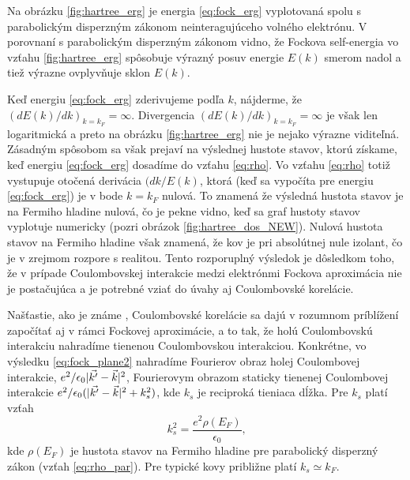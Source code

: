 Na obrázku \ref{fig:hartree_erg} je energia \eqref{eq:fock_erg} vyplotovaná spolu s parabolickým disperzným zákonom neinteragujúceho volného elektrónu.
V porovnaní s parabolickým disperzným zákonom vidno, že Fockova self-energia vo vzťahu \ref{fig:hartree_erg} spôsobuje výrazný posuv energie $E(k)$ smerom nadol a tiež výrazne ovplyvňuje sklon $E(k)$.



Keď energiu \eqref{eq:fock_erg} zderivujeme podľa $k$, nájderme, že $(dE(k)/dk)_{k=k_F}=\infty$. Divergencia
$(dE(k)/dk)_{k=k_F}=\infty$ je však len logaritmická a preto na obrázku \ref{fig:hartree_erg} nie je nejako výrazne viditeľná. Zásadným spôsobom sa však prejaví
 na výslednej hustote stavov, ktorú získame, keď energiu \eqref{eq:fock_erg} dosadíme
do vzťahu \eqref{eq:rho}. Vo vzťahu \eqref{eq:rho} totiž vystupuje otočená derivácia $(dk/E(k)$, ktorá (keď sa vypočíta pre energiu \eqref{eq:fock_erg}) je v bode $k=k_F$ nulová.
To znamená že výsledná hustota stavov je na Fermiho hladine nulová, čo je pekne vidno, keď sa graf hustoty stavov vyplotuje numericky (pozri obrázok \ref{fig:hartree_dos_NEW}).
Nulová hustota stavov na Fermiho hladine však znamená, že kov je pri absolútnej nule izolant, čo je v zrejmom rozpore s realitou.
Tento rozporuplný výsledok je dôsledkom toho, že v prípade Coulombovskej interakcie medzi elektrónmi Fockova aproximácia nie je postačujúca a je potrebné
vziať do úvahy aj Coulombovské korelácie.

 Našťastie, ako je známe \cite{Mermin}, Coulombovské korelácie sa dajú v rozumnom príblížení  započítať aj v rámci Fockovej aproximácie, a to tak, že holú Coulombovskú interakciu nahradíme
tienenou Coulombovskou interakciou.
Konkrétne, vo výsledku \eqref{eq:fock_plane2} nahradíme Fourierov obraz holej Coulombovej interakcie, $e^2/\epsilon_0|\vec{k'}-\vec{k}|^2$,
Fourierovym obrazom staticky tienenej Coulombovej interakcie $e^2/\epsilon_0(|\vec{k'}-\vec{k}|^2+k_s^2)$, kde $k_s$ je reciproká tieniaca dĺžka. Pre $k_s$ platí vzťah
\begin{equation}
  \label{eq:screeningvector}
  k_s^2 = \frac{e^2 \rho(E_F)}{\epsilon_0} \text{,}
 \end{equation}
kde $\rho(E_F)$ je hustota stavov na Fermiho hladine pre parabolický disperzný zákon (vzťah \eqref{eq:rho_par}). Pre typické kovy približne platí $k_s \simeq k_F$.


